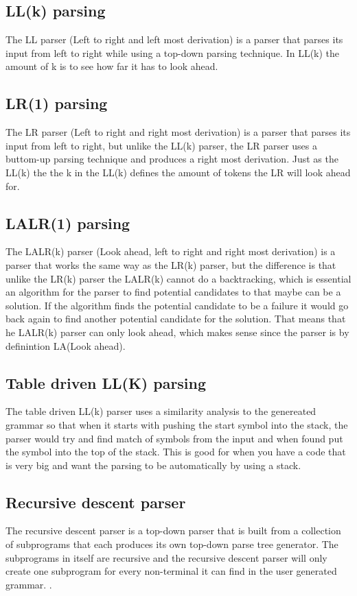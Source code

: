 \subsection*{LL(k) parsing}
The LL parser (Left to right and left most derivation) is a parser that parses its input from left to right while using a top-down parsing technique. In LL(k) the amount of k is to see how far it has to look ahead.\cite{conceptsOfProgrammingLanguages}


\subsection*{LR(1) parsing}
The LR parser (Left to right and right most derivation) is a parser that parses its input from left to right, but unlike the LL(k) parser, the LR parser uses a buttom-up parsing technique and produces a right most derivation. Just as the LL(k) the the k in the LL(k) defines the amount of tokens the LR will look ahead for\cite{LL-LR-Difference}. 

\subsection*{LALR(1) parsing}
The LALR(k) parser (Look ahead, left to right and right most derivation) is a parser that works the same way as the LR(k) parser, but the difference is that unlike the LR(k) parser the LALR(k) cannot do a backtracking, which is essential an algorithm for the parser to find potential candidates to that maybe can be a solution. If the algorithm finds the potential candidate to be a failure it would go back again to find another potential candidate for the solution. That means that he LALR(k) parser can only look ahead, which makes sense since the parser is by definintion LA(Look ahead)\cite{crafting-a-compiler}.

\subsection*{Table driven LL(K) parsing}
The table driven LL(k) parser uses a similarity analysis to the genereated grammar so that when it starts with pushing the start symbol into the stack, the parser would try and find match of symbols from the input and when found put the symbol into the top of the stack\cite{crafting-a-compiler}. This is good for when you have a code that is very big and want the parsing to be automatically by using a stack.

\subsection*{Recursive descent parser} 
The recursive descent parser is a top-down parser that is built from a collection of subprograms that each produces its own top-down parse tree generator. The subprograms in itself are recursive and the recursive descent parser will only create one subprogram for every non-terminal it can find in the user generated grammar. \cite{conceptsOfProgrammingLanguages}. 
